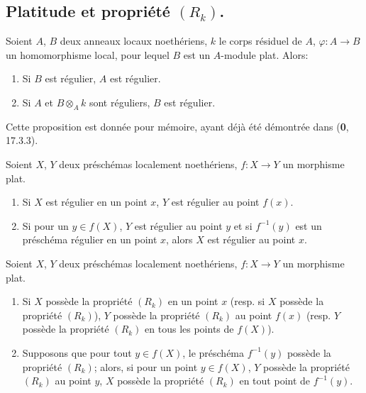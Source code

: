 \subsection{\texorpdfstring{Platitude et propriété $(R_k)$.}{Platitude et propriété (R\string_k)}}

\begin{proposition}[6.5.1]
Soient $A$, $B$ deux anneaux locaux noethériens, $k$ le corps résiduel
de $A$, $\varphi:A\to B$ un homomorphisme local, pour lequel $B$ est un
$A$-module plat. Alors:
\begin{enumerate}
\item[\textup{(i)}] Si $B$ est régulier, $A$ est régulier.
\item[\textup{(ii)}] Si $A$ et $B\otimes_Ak$ sont réguliers, $B$ est régulier.
\end{enumerate}
\end{proposition}

Cette proposition est donnée pour mémoire, ayant déjà été démontrée dans
(\textbf{0}, 17.3.3).

\begin{corollary}[6.5.2]
\label{IV.2.s6.5.2-fr}
Soient $X$, $Y$ deux préschémas localement noethériens, $f:X\to Y$
un morphisme plat.
\begin{enumerate}
\item[\textup{(i)}] Si $X$ est régulier en un point $x$, $Y$ est régulier au point
$f(x)$.
\item[\textup{(ii)}] Si pour un $y\in f(X)$, $Y$ est régulier au point $y$ et si
$f^{-1}(y)$ est un préschéma régulier en un point $x$, alors $X$ est
régulier au point $x$.
\end{enumerate}
\end{corollary}

\begin{proposition}[6.5.3]
\label{IV.2.s6.5.3-fr}
Soient $X$, $Y$ deux préschémas localement noethériens, $f:X\to Y$
un morphisme plat.
\begin{enumerate}
\item[\textup{(i)}] Si $X$ possède la propriété $(R_k)$ en un point $x$
\textup{(resp.} si $X$ possède la propriété $(R_k)$), $Y$ possède la propriété
$(R_k)$ au point $f(x)$ \textup{(resp.} $Y$ possède la propriété $(R_k)$ en tous
les points de $f(X)$).
\item[\textup{(ii)}] Supposons que pour tout $y\in f(X)$, le préschéma
$f^{-1}(y)$ possède la propriété $(R_k)$; alors, si pour un point
$y\in f(X)$, $Y$ possède la propriété $(R_k)$ au point $y$, $X$ possède
la propriété $(R_k)$ en tout point de $f^{-1}(y)$.
\end{enumerate}
\end{proposition}

